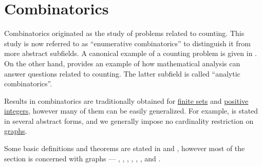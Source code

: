 \section{Combinatorics}\label{sec:combinatorics}

Combinatorics originated as the study of problems related to counting. This study is now referred to as \enquote{enumerative combinatorics} to distinguish it from more abstract subfields. A canonical example of a counting problem is given in . On the other hand,  provides an example of how mathematical analysis can answer questions related to counting. The latter subfield is called \enquote{analytic combinatorics}.

Results in combinatorics are traditionally obtained for \hyperref[def:set_finiteness]{finite sets} and \hyperref[def:integer_signum]{positive integers}, however many of them can be easily generalized. For example,  is stated in several abstract forms, and we generally impose no cardinality restriction on \hyperref[def:directed_graph]{graphs}.

Some basic definitions and theorems are stated in  and , however most of the section is concerned with graphs --- , , , , , ,  and .

